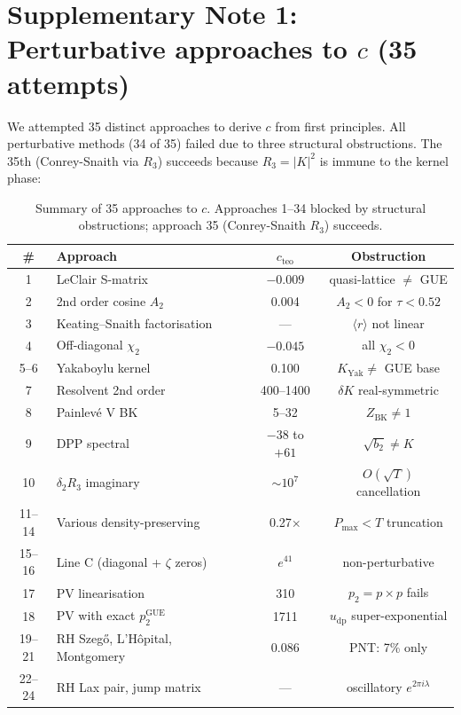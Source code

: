 \documentclass[10pt]{article}
\begin{document}
\section{Supplementary Note 1: Perturbative approaches to $c$ (35 attempts)}

We attempted 35 distinct approaches to derive $c$ from first
principles. All perturbative methods (34 of 35) failed due to three
structural obstructions. The 35th (Conrey-Snaith via $R_3$) succeeds
because $R_3 = |K|^2$ is immune to the kernel phase:

\begin{table}[H]
\centering
\caption{Summary of 35 approaches to $c$. Approaches 1--34 blocked by
structural obstructions; approach 35 (Conrey-Snaith $R_3$) succeeds.}
\label{tab:29approaches}
\begin{tabular}{clcc}
\toprule
\# & Approach & $c_{\mathrm{teo}}$ & Obstruction \\
\midrule
1 & LeClair S-matrix & $-0.009$ & quasi-lattice $\neq$ GUE \\
2 & 2nd order cosine $A_2$ & 0.004 & $A_2 < 0$ for $\tau < 0.52$ \\
3 & Keating--Snaith factorisation & --- & $\langle r\rangle$ not linear \\
4 & Off-diagonal $\chi_2$ & $-0.045$ & all $\chi_2 < 0$ \\
5--6 & Yakaboylu kernel & 0.100 & $K_{\mathrm{Yak}} \neq$ GUE base \\
7 & Resolvent 2nd order & 400--1400 & $\delta K$ real-symmetric \\
8 & Painlev\'e V BK & 5--32 & $Z_{\mathrm{BK}} \neq 1$ \\
9 & DPP spectral & $-38$ to $+61$ & $\sqrt{b_2} \neq K$ \\
10 & $\delta_2 R_3$ imaginary & $\sim 10^7$ & $O(\sqrt{T})$ cancellation \\
11--14 & Various density-preserving & 0.27$\times$ & $P_{\max} < T$ truncation \\
15--16 & Line C (diagonal + $\zeta$ zeros) & $e^{41}$ & non-perturbative \\
17 & PV linearisation & 310 & $p_2 = p \times p$ fails \\
18 & PV with exact $p_2^{\mathrm{GUE}}$ & 1711 & $u_{\mathrm{dp}}$ super-exponential \\
19--21 & RH Szeg\H{o}, L'H\^opital, Montgomery & 0.086 & PNT: 7\% only \\
22--24 & RH Lax pair, jump matrix & --- & oscillatory $e^{2\pi i\lambda}$ \\

\end{tabular}
\end{table}
\end{document}
